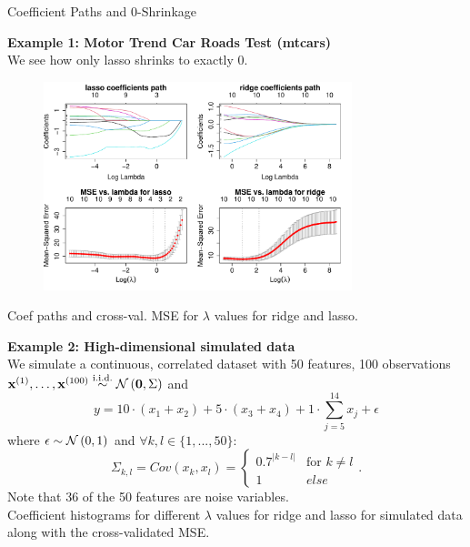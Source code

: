 \documentclass[11pt,compress,t,notes=noshow, xcolor=table]{beamer}
\begin{document}
\begin{vbframe}{Coefficient Paths and 0-Shrinkage}

\textbf{Example 1: Motor Trend Car Roads Test (mtcars)} \\

We see how only lasso shrinks to exactly 0.

\begin{figure}
\includegraphics[width=0.8\textwidth]{figure_man/l1_l2_regupaths_mse.pdf}\\
\end{figure}
\vspace{-0.3cm}
Coef paths and cross-val. MSE for $\lambda$ values for ridge and lasso.

\framebreak
\textbf{Example 2: High-dimensional simulated data} \\
We simulate a continuous, correlated dataset with 50 features, 100 observations $\mathbf{x}^{(1)},\dots, \mathbf{x}^{(100)} \overset{\text{i.i.d.}}{\sim} \mathcal{N} \left(\mathbf{0}, \Sigma \right)$ and 
$$ y = 10 \cdot (x_1 + x_2) + 5 \cdot (x_3 + x_4) + 1 \cdot \sum_{j = 5}^{14} x_j + \epsilon $$
where $\epsilon \sim \mathcal{N} \left(0, 1\right)$ and $ \forall k, l \in \{1, ..., 50\}$: 
$$\Sigma_{k,l}=Cov(x_k, x_l) = 
  \begin{cases}
   0.7^{|k-l|} & \text{for } k \neq l \\
   1 & else 
   \end{cases}. 
$$ 
Note that 36 of the 50 features are noise variables. \\
\framebreak 
Coefficient histograms for different $\lambda$ values for ridge and lasso for simulated data along with the cross-validated MSE.


\end{vbframe}
\end{document}

